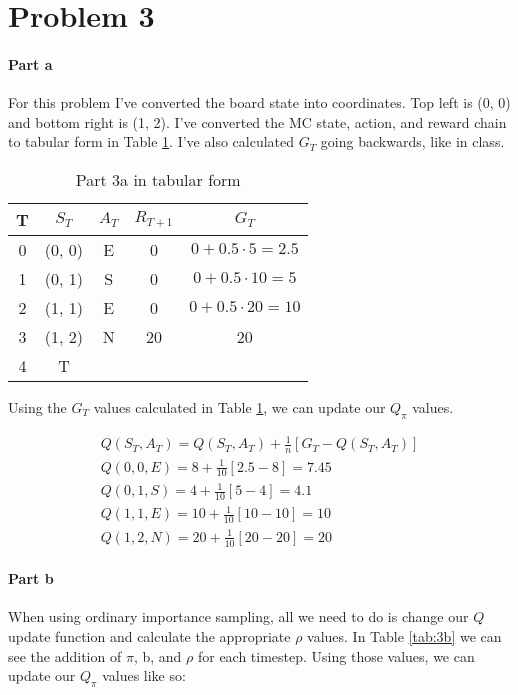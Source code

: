 \documentclass[12pt]{article}
\begin{document}
\section{Problem 3}

\paragraph{Part a}

For this problem I've converted the board state into coordinates. Top left is (0, 0) and bottom right is (1, 2). I've converted the MC state, action, and reward chain to tabular form in Table \ref{tab:3a}. I've also calculated $G_T$ going backwards, like in class.

\begin{table}[!htb]
  \centering
  \caption{Part 3a in tabular form}
  \label{tab:3a}
  \begin{tabular}{|c|c|c|c|c|}
    \hline
    T & $S_T$  & $A_T$ & $R_{T+1}$ & $G_T$                   \\ \hline
    0 & (0, 0) & E     & 0         & $0 + 0.5 \cdot 5 = 2.5$ \\ \hline
    1 & (0, 1) & S     & 0         & $0 + 0.5 \cdot 10 = 5$  \\ \hline
    2 & (1, 1) & E     & 0         & $0 + 0.5 \cdot 20 = 10$ \\ \hline
    3 & (1, 2) & N     & 20        & 20                      \\ \hline
    4 & T      &       &           &                         \\ \hline
  \end{tabular}
\end{table}

Using the $G_T$ values calculated in Table \ref{tab:3a}, we can update our $Q_\pi$ values.

\begin{gather*}
  Q(S_T, A_T) = Q(S_T, A_T) + \frac{1}{n}[G_T - Q(S_T, A_T)] \\
  Q(0, 0, E) = 8 + \frac{1}{10}[2.5 - 8] = 7.45 \\
  Q(0, 1, S) = 4 + \frac{1}{10}[5 - 4] = 4.1 \\
  Q(1, 1, E) = 10 + \frac{1}{10}[10 - 10] = 10 \\
  Q(1, 2, N) = 20 + \frac{1}{10}[20 - 20] = 20
\end{gather*}

\paragraph{Part b} When using ordinary importance sampling, all we need to do is change our $Q$ update function and calculate the appropriate $\rho$ values. In Table \ref{tab:3b} we can see the addition of $\pi$, b, and $\rho$ for each timestep. Using those values, we can update our $Q_\pi$ values like so:
\end{document}
